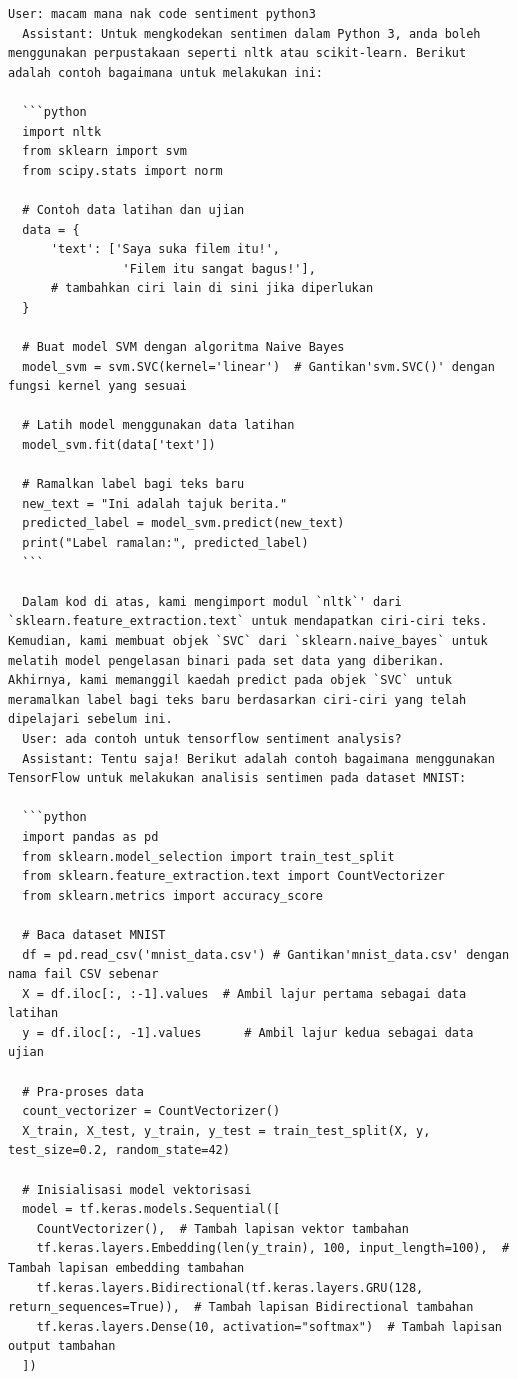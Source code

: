 \documentclass[preprint]{article}
\begin{document}
\begin{lstlisting}[breaklines=true]
  User: macam mana nak code sentiment python3
  Assistant: Untuk mengkodekan sentimen dalam Python 3, anda boleh menggunakan perpustakaan seperti nltk atau scikit-learn. Berikut adalah contoh bagaimana untuk melakukan ini:

  ```python
  import nltk
  from sklearn import svm
  from scipy.stats import norm
  
  # Contoh data latihan dan ujian
  data = {
      'text': ['Saya suka filem itu!',
                'Filem itu sangat bagus!'],
      # tambahkan ciri lain di sini jika diperlukan
  }
  
  # Buat model SVM dengan algoritma Naive Bayes
  model_svm = svm.SVC(kernel='linear')  # Gantikan'svm.SVC()' dengan fungsi kernel yang sesuai
  
  # Latih model menggunakan data latihan
  model_svm.fit(data['text'])
  
  # Ramalkan label bagi teks baru
  new_text = "Ini adalah tajuk berita."
  predicted_label = model_svm.predict(new_text)
  print("Label ramalan:", predicted_label)
  ```

  Dalam kod di atas, kami mengimport modul `nltk`' dari `sklearn.feature_extraction.text` untuk mendapatkan ciri-ciri teks. Kemudian, kami membuat objek `SVC` dari `sklearn.naive_bayes` untuk melatih model pengelasan binari pada set data yang diberikan. Akhirnya, kami memanggil kaedah predict pada objek `SVC` untuk meramalkan label bagi teks baru berdasarkan ciri-ciri yang telah dipelajari sebelum ini.
  User: ada contoh untuk tensorflow sentiment analysis?
  Assistant: Tentu saja! Berikut adalah contoh bagaimana menggunakan TensorFlow untuk melakukan analisis sentimen pada dataset MNIST:

  ```python
  import pandas as pd
  from sklearn.model_selection import train_test_split
  from sklearn.feature_extraction.text import CountVectorizer
  from sklearn.metrics import accuracy_score
  
  # Baca dataset MNIST
  df = pd.read_csv('mnist_data.csv') # Gantikan'mnist_data.csv' dengan nama fail CSV sebenar
  X = df.iloc[:, :-1].values  # Ambil lajur pertama sebagai data latihan
  y = df.iloc[:, -1].values      # Ambil lajur kedua sebagai data ujian
  
  # Pra-proses data
  count_vectorizer = CountVectorizer()
  X_train, X_test, y_train, y_test = train_test_split(X, y, test_size=0.2, random_state=42)
  
  # Inisialisasi model vektorisasi
  model = tf.keras.models.Sequential([
    CountVectorizer(),  # Tambah lapisan vektor tambahan
    tf.keras.layers.Embedding(len(y_train), 100, input_length=100),  # Tambah lapisan embedding tambahan
    tf.keras.layers.Bidirectional(tf.keras.layers.GRU(128, return_sequences=True)),  # Tambah lapisan Bidirectional tambahan
    tf.keras.layers.Dense(10, activation="softmax")  # Tambah lapisan output tambahan
  ])
  

\end{lstlisting}
\end{document}
